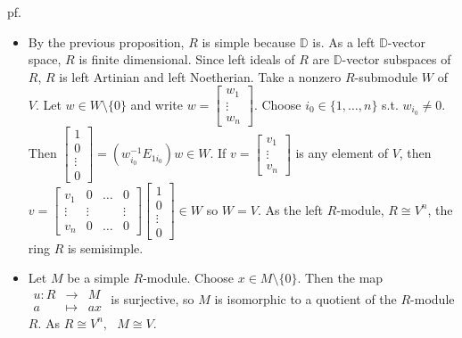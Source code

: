 \documentclass[12pt,letterpaper]{report}
\begin{document}
pf.\begin{itemize}
\item By the previous proposition, $R$ is simple because $\mathbb{D}$ is. As a left $\mathbb{D}$-vector space, $R$ is finite dimensional. Since left ideals of $R$ are $\mathbb{D}$-vector subspaces of $R$, $R$ is left Artinian and left Noetherian. Take a nonzero $R$-submodule $W$ of $V$. Let $w\in W\setminus\{0\}$ and write $w=\begin{bmatrix}w_{1}\\\vdots\\w_{n}\end{bmatrix}.$ Choose $i_{0}\in\{1,\dots,n\}$ s.t. $w_{i_{0}}\neq0$. Then $\begin{bmatrix}1\\0\\\vdots\\0\end{bmatrix}=(w_{i_{0}}^{-1}E_{1i_{0}})w\in W$. If $v=\begin{bmatrix}v_{1}\\\vdots\\v_{n}\end{bmatrix}$ is any element of $V$, then $v=\begin{bmatrix}v_{1}&0&\hdots&0\\\vdots&\vdots&&\vdots\\v_{n}&0&\hdots&0\end{bmatrix}\begin{bmatrix}1\\0\\\vdots\\0\end{bmatrix}\in W$ so $W=V$. As the left $R$-module, $R\cong V^{n}$, the ring $R$ is semisimple.
\item Let $M$ be a simple $R$-module. Choose $x\in M\setminus\{0\}$. Then the map $\begin{array}{rrr}u:R&\rightarrow &M\\a&\mapsto&ax\end{array}$ is surjective, so $M$ is isomorphic to a quotient of the $R$-module $R$. As $R\cong V^{n},\,\,\,\,M\cong V$. 

\end{itemize}
\end{document}
